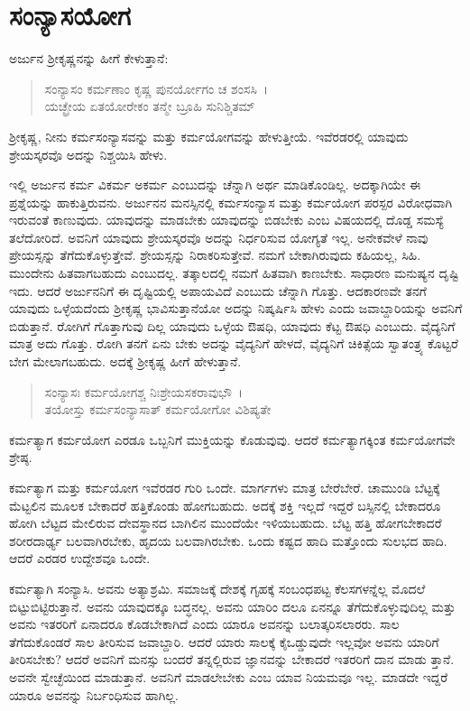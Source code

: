 
\chapter{ಸಂನ್ಯಾಸಯೋಗ}

ಅರ್ಜುನ ಶ‍್ರೀಕೃಷ್ಣನನ್ನು ಹೀಗೆ ಕೇಳುತ್ತಾನೆ:

\begin{verse}
ಸಂನ್ಯಾಸಂ ಕರ್ಮಣಾಂ ಕೃಷ್ಣ ಪುನರ್ಯೋಗಂ ಚ ಶಂಸಸಿ~।\\ಯಚ್ಛ್ರೇಯ ಏತಯೋರೇಕಂ ತನ್ಮೇ ಬ್ರೂಹಿ ಸುನಿಶ್ಚಿತಮ್ 
\end{verse}

{\small ಶ‍್ರೀಕೃಷ್ಣ, ನೀನು ಕರ್ಮಸಂನ್ಯಾಸವನ್ನು ಮತ್ತು ಕರ್ಮಯೋಗವನ್ನು ಹೇಳುತ್ತೀಯೆ. ಇವೆರಡರಲ್ಲಿ ಯಾವುದು ಶ್ರೇಯಸ್ಕರವೊ ಅದನ್ನು ನಿಶ್ಚಯಿಸಿ ಹೇಳು.}

ಇಲ್ಲಿ ಅರ್ಜುನ ಕರ್ಮ ವಿಕರ್ಮ ಅಕರ್ಮ ಎಂಬುದನ್ನು ಚೆನ್ನಾಗಿ ಅರ್ಥ ಮಾಡಿಕೊಂಡಿಲ್ಲ. ಅದಕ್ಕಾಗಿಯೇ ಈ ಪ್ರಶ್ನೆಯನ್ನು ಹಾಕುತ್ತಿರುವನು. ಅರ್ಜುನನ ಮನಸ್ಸಿನಲ್ಲಿ ಕರ್ಮಸಂನ್ಯಾಸ ಮತ್ತು ಕರ್ಮಯೋಗ ಪರಸ್ಪರ ವಿರೋಧವಾಗಿ ಇರುವಂತೆ ಕಾಣುವುದು. ಯಾವುದನ್ನು ಮಾಡಬೇಕು ಯಾವುದನ್ನು ಬಿಡಬೇಕು ಎಂಬ ವಿಷಯದಲ್ಲಿ ದೊಡ್ಡ ಸಮಸ್ಯೆ ತಲೆದೋರಿದೆ. ಅವನಿಗೆ ಯಾವುದು ಶ್ರೇಯಸ್ಕರವೊ ಅದನ್ನು ನಿರ್ಧರಿಸುವ ಯೋಗ್ಯತೆ ಇಲ್ಲ. ಅನೇಕವೇಳೆ ನಾವು ಪ್ರೇಯಸ್ಸನ್ನು ತೆಗೆದುಕೊಳ್ಳುತ್ತೇವೆ. ಶ್ರೇಯಸ್ಸನ್ನು ನಿರಾಕರಿಸುತ್ತೇವೆ. ನಮಗೆ ಬೇಕಾಗಿರುವುದು ಕಹಿಯಲ್ಲ, ಸಿಹಿ. ಮುಂದೇನು ಹಿತವಾಗಬಹುದು ಎಂಬುದಲ್ಲ. ತತ್ಕಾಲದಲ್ಲಿ ನಮಗೆ ಹಿತವಾಗಿ ಕಾಣಬೇಕು. ಸಾಧಾರಣ ಮನುಷ್ಯನ ದೃಷ್ಟಿ ಇದು. ಆದರೆ ಅರ್ಜುನನಿಗೆ ಈ ದೃಷ್ಟಿಯಲ್ಲಿ ಅಪಾಯವಿದೆ ಎಂಬುದು ಚೆನ್ನಾಗಿ ಗೊತ್ತು. ಆದಕಾರಣವೇ ತನಗೆ ಯಾವುದು ಒಳ್ಳೆಯದೆಂದು ಶ‍್ರೀಕೃಷ್ಣ ಭಾವಿಸುತ್ತಾನೆಯೋ ಅದನ್ನು ನಿಷ್ಕರ್ಷಿಸಿ ಹೇಳು ಎಂದು ಜವಾಬ್ದಾರಿಯನ್ನು ಅವನಿಗೆ ಬಿಡುತ್ತಾನೆ. ರೋಗಿಗೆ ಗೊತ್ತಾಗುವು ದಿಲ್ಲ ಯಾವುದು ಒಳ್ಳೆಯ ಔಷಧಿ, ಯಾವುದು ಕೆಟ್ಟ ಔಷಧಿ ಎಂಬುದು. ವೈದ್ಯನಿಗೆ ಮಾತ್ರ ಅದು ಗೊತ್ತು. ರೋಗಿ ತನಗೆ ಏನು ಬೇಕು ಅದನ್ನು ವೈದ್ಯನಿಗೆ ಹೇಳದೆ, ವೈದ್ಯನಿಗೆ ಚಿಕಿತ್ಸೆಯ ಸ್ವಾತಂತ್ರ್ಯ ಕೊಟ್ಟರೆ ಬೇಗ ಮೇಲಾಗಬಹುದು. ಅದಕ್ಕೆ ಶ‍್ರೀಕೃಷ್ಣ ಹೀಗೆ ಹೇಳುತ್ತಾನೆ.

\begin{verse}
ಸಂನ್ಯಾಸಃ ಕರ್ಮಯೋಗಶ್ಚ ನಿಃಶ್ರೇಯಸಕರಾವುಭೌ~।\\ತಯೋಸ್ತು ಕರ್ಮಸಂನ್ಯಾಸಾತ್ ಕರ್ಮಯೋಗೋ ವಿಶಿಷ್ಯತೇ 
\end{verse}

{\small ಕರ್ಮತ್ಯಾಗ ಕರ್ಮಯೋಗ ಎರಡೂ ಒಬ್ಬನಿಗೆ ಮುಕ್ತಿಯನ್ನು ಕೊಡುವುವು. ಆದರೆ ಕರ್ಮತ್ಯಾಗಕ್ಕಿಂತ ಕರ್ಮಯೋಗವೇ ಶ್ರೇಷ್ಠ.}

ಕರ್ಮತ್ಯಾಗ ಮತ್ತು ಕರ್ಮಯೋಗ ಇವೆರಡರ ಗುರಿ ಒಂದೇ. ಮಾರ್ಗಗಳು ಮಾತ್ರ ಬೇರೆಬೇರೆ. ಚಾಮುಂಡಿ ಬೆಟ್ಟಕ್ಕೆ ಮೆಟ್ಟಲಿನ ಮೂಲಕ ಬೇಕಾದರೆ ಹತ್ತಿಕೊಂಡು ಹೋಗಬಹುದು. ಅದಕ್ಕೆ ಶಕ್ತಿ ಇಲ್ಲದೆ ಇದ್ದರೆ ಬಸ್ಸಿನಲ್ಲಿ ಬೇಕಾದರೂ ಹೋಗಿ ಬೆಟ್ಟದ ಮೇಲಿರುವ ದೇವಸ್ಥಾನದ ಬಾಗಿಲಿನ ಮುಂದೆಯೇ ಇಳಿಯಬಹುದು. ಬೆಟ್ಟ ಹತ್ತಿ ಹೋಗಬೇಕಾದರೆ ಶರೀರದಾರ್ಢ್ಯ ಬಲವಾಗಿರಬೇಕು, ಹೃದಯ ಬಲವಾಗಿರಬೇಕು. ಒಂದು ಕಷ್ಟದ ಹಾದಿ ಮತ್ತೊಂದು ಸುಲಭದ ಹಾದಿ. ಆದರೆ ಎರಡರ ಉದ್ದೇಶವೂ ಒಂದೇ.

ಕರ್ಮತ್ಯಾಗಿ ಸಂನ್ಯಾಸಿ. ಅವನು ಅತ್ಯಾಶ್ರಮಿ. ಸಮಾಜಕ್ಕೆ ದೇಶಕ್ಕೆ ಗೃಹಕ್ಕೆ ಸಂಬಂಧಪಟ್ಟ ಕೆಲಸಗಳನ್ನೆಲ್ಲ ಮೊದಲೆ ಬಿಟ್ಟುಬಿಟ್ಟಿರುತ್ತಾನೆ. ಅವನು ಯಾವುದಕ್ಕೂ ಬದ್ಧನಲ್ಲ. ಅವನು ಯಾರಿಂ ದಲೂ ಏನನ್ನೂ ತೆಗೆದುಕೊಳ್ಳುವುದಿಲ್ಲ ಮತ್ತು ಅವನು ಇತರರಿಗೆ ಏನಾದರೂ ಕೊಡಬೇಕಾಗಿದೆ ಎಂದು ಯಾರೂ ಅವನನ್ನು ಬಲಾತ್ಕರಿಸಲಾರರು. ಸಾಲ ತೆಗೆದುಕೊಂಡರೆ ಸಾಲ ತೀರಿಸುವ ಜವಾಬ್ದಾರಿ. ಆದರೆ ಯಾರು ಸಾಲಕ್ಕೆ ಕೈಒಡ್ಡುವುದೇ ಇಲ್ಲವೋ ಅವನು ಯಾರಿಗೆ ತೀರಿಸಬೇಕು? ಆದರೆ ಅವನಿಗೆ ಮನಸ್ಸು ಬಂದರೆ ತನ್ನಲ್ಲಿರುವ ಜ್ಞಾನವನ್ನು ಬೇಕಾದರೆ ಇತರರಿಗೆ ದಾನ ಮಾಡು ತ್ತಾನೆ. ಅವನೇ ಸ್ವೇಚ್ಛೆಯಿಂದ ಮಾಡುತ್ತಾನೆ. ಅವನಿಗೆ ಮಾಡಲೇಬೇಕು ಎಂಬ ಯಾವ ನಿಯಮವೂ ಇಲ್ಲ. ಮಾಡದೇ ಇದ್ದರೆ ಯಾರೂ ಅವನನ್ನು ನಿರ್ಬಂಧಿಸುವ ಹಾಗಿಲ್ಲ.


